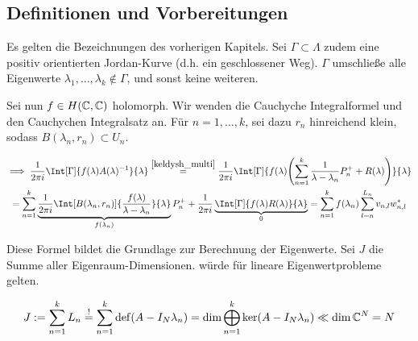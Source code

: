 \subsection*{Definitionen und Vorbereitungen}

Es gelten die Bezeichnungen des vorherigen Kapitels.
Sei $\Gamma \subset \Lambda$ zudem eine positiv orientierten Jordan-Kurve (d.h. ein geschlossener Weg).
$\Gamma$ umschließe alle Eigenwerte $\lambda_1, \dots, \lambda_k \not \in \Gamma$, und sonst keine weiteren.



Sei nun $f \in H(\mathbb{C}, \mathbb{C})$ holomorph.
Wir wenden die Cauchyche Integralformel und den Cauchychen Integralsatz \cite{KAna} an.
Für $n = 1, \dots, k$, sei dazu $r_n$ hinreichend klein, sodass $B(\lambda_n, r_n) \subset U_n$.

\begin{multline} \label{eq:cauchysche_integral_formel_satz}
    \implies
    \frac{1}{2 \pi i}
    \Int[\Gamma]
    {
        f(\lambda) A(\lambda)^{-1}
    }{\lambda}
    \stackrel
    {
        \ref{keldysh_multi}
    }{=}
    \frac{1}{2 \pi i}
    \Int[\Gamma]
    {
        f(\lambda)
        \pbraces
        {
            \sum_{n=1}^k
                \frac{1}{\lambda - \lambda_n} P_n^+
                +
                R(\lambda)
        }
    }{\lambda} \\
    =
    \sum_{n=1}^k
        \underbrace
        {
            \frac{1}{2 \pi i}
            \Int[B(\lambda_n, r_n)]
            {
                \frac{f(\lambda)}{\lambda - \lambda_n}
            }{\lambda}
        }_{f(\lambda_n)}
        P_n^+
    +
    \frac{1}{2 \pi i}
    \underbrace
    {
        \Int[\Gamma]
        {
            f(\lambda) R(\lambda)
        }{\lambda}
    }_0
    =
    \sum_{n=1}^k
        f(\lambda_n)
        \sum_{l=n}^{L_n}
            v_{n, l} w_{n, l}^\ast
\end{multline}

Diese Formel bildet die Grundlage zur Berechnung der Eigenwerte.
Sei $J$ die Summe aller Eigenraum-Dimensionen.
\Quote{!} würde für lineare Eigenwertprobleme gelten.

\begin{align*}
    J
    :=
    \sum_{n=1}^k
        L_n
    \stackrel{!}{=}
    \sum_{n=1}^k
        \operatorname{def}(A - I_N \lambda_n)
    =
    \dim
    \bigoplus_{n=1}^k
        \ker (A - I_N \lambda_n)
    \ll
    \dim \mathbb{C}^N
    =
    N
\end{align*}

